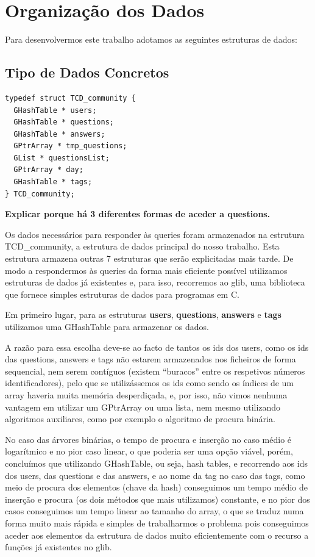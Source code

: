 \documentclass[a4paper]{article}
\begin{document}
\section{Organização dos Dados}
\label{sec:estruturadedados}

Para desenvolvermos este trabalho adotamos as seguintes estruturas de dados:

\subsection{Tipo de Dados Concretos}
\label{sec:dados_concretos}

\begin{verbatim}
typedef struct TCD_community {
  GHashTable * users;
  GHashTable * questions;
  GHashTable * answers;
  GPtrArray * tmp_questions;
  GList * questionsList;
  GPtrArray * day;
  GHashTable * tags;
} TCD_community;
\end{verbatim}

\textbf{Explicar porque há 3 diferentes formas de aceder a questions.}

\vspace{0.2cm}

Os dados necessários para responder às queries foram armazenados
na estrutura TCD\_community, a estrutura de dados principal do nosso trabalho.
Esta estrutura armazena outras 7 estruturas que serão explicitadas mais tarde.
De modo a respondermos às queries da forma mais eficiente possível
utilizamos estruturas de dados já existentes e, para isso, recorremos ao glib,
uma biblioteca que fornece simples estruturas de dados para programas em C. \par

Em primeiro lugar, para as estruturas \textbf{users}, \textbf{questions},
\textbf{answers} e \textbf{tags}
utilizamos uma GHashTable para armazenar os dados. \par
A razão para essa escolha deve-se ao facto de tantos os ids dos users, como os
ids das questions, answers e tags não estarem armazenados nos ficheiros de forma
sequencial, nem serem contíguos (existem ``buracos'' entre os respetivos números
identificadores), pelo que se utilizássemos os ids como sendo os índices de um
array haveria muita memória desperdiçada, e, por isso, não vimos nenhuma vantagem
em utilizar um GPtrArray ou uma lista, nem mesmo utilizando algoritmos auxiliares,
como por exemplo o algoritmo de procura binária.

No caso das árvores binárias, o tempo de procura e inserção no caso médio é
logarítmico e no pior caso linear, o que poderia ser uma opção viável, porém,
concluímos que utilizando GHashTable, ou seja, hash tables, e recorrendo aos ids
dos users, das questions e das answers, e ao nome da tag no caso das tags, como
meio de procura dos elementos (chave da hash) conseguimos um tempo médio de
inserção e procura (os dois métodos que mais utilizamos) constante, e no pior
dos casos conseguimos um tempo linear ao tamanho do array, o que se traduz numa
forma muito mais rápida e simples de trabalharmos o problema pois conseguimos
aceder aos elementos da estrutura de dados muito eficientemente com o
recurso a funções já existentes no glib. \par
\end{document}
